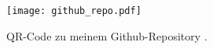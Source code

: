 \documentclass[parskip=full]{scrreprt}
\title{\maTitle}
\author{Nelio Gautschi\vspace{1cm}\\
Betreut durch \\
Stefan Rothe}
\begin{document}
\maketitle

\tableofcontents







\listoffigures
\listoftables
\printbibliography

\begin{figure}[H]
    \centering
        \texttt{[image: github\_repo.pdf]}
    \caption{QR-Code zu meinem Github-Repository \cite{git:repo}.}
        \label{qr:github}
\end{figure}
\end{document}

